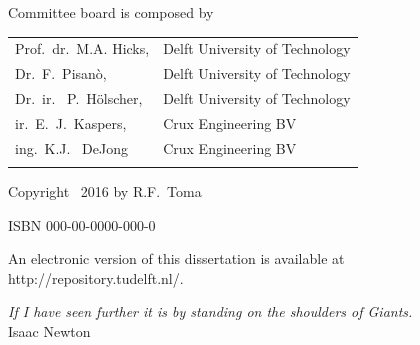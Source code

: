 \documentclass[10pt,a4paper]{report}
\begin{document}
\begin{titlepage}
\begin{center}
		\end{center}
		\vfill
		\noindent Committee board is composed by
		
		
		\medskip\noindent
		\begin{tabular}{p{5cm}l}
			Prof.\ dr.\ M.A. Hicks, & Delft University of Technology \\
			Dr.\ F.\ Pisan\`{o}, & Delft University of Technology \\
			Dr.\ ir. \ P.\ H\"{o}lscher, & Delft University of Technology \\
			ir.\ E.\ J.\ Kaspers, & Crux Engineering BV\\
			ing.\ K.J. \ DeJong & Crux Engineering BV\\
			
			\medskip
		
	\end{tabular}
		
		\vspace{4\bigskipamount}
		
		\noindent Copyright \textcopyright\ 2016 by R.F.~Toma
		
		
		\medskip
		\noindent ISBN 000-00-0000-000-0
		
		\medskip
		\noindent An electronic version of this dissertation is available at \\
		{http://repository.tudelft.nl/}.
		
	\end{titlepage}
\newenvironment{dedication}
{\clearpage           %
	\thispagestyle{empty}%
	\vspace*{\stretch{1}}%
	\raggedleft          %
}
{\par %
	\vspace{\stretch{3}} %
	\clearpage           %
}
	\begin{dedication}
	\textit{If I have seen further it is by standing on the shoulders of Giants.} \\
	Isaac Newton
	\end{dedication}
\end{document}

